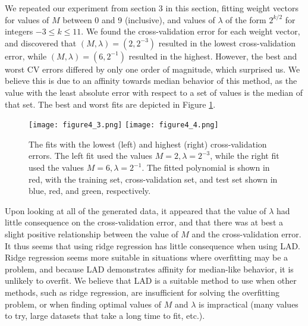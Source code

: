 \documentclass{article}
\begin{document}
We repeated our experiment from section 3 in this section, fitting weight vectors for values of $M$ between 0 and 9 (inclusive), and values of $\lambda$ of the form $2^{k/2}$ for integers $-3 \le k \le 11$. We found the cross-validation error for each weight vector, and discovered that $(M, \lambda) = (2, 2^{-3})$ resulted in the lowest cross-validation error, while $(M, \lambda) = (6, 2^{-1})$ resulted in the highest. However, the best and worst CV errors differed by only one order of magnitude, which surprised us. We believe this is due to an affinity towards median behavior of this method, as the value with the least absolute error with respect to a set of values is the median of that set. The best and worst fits are depicted in Figure \ref{p4figure}.

\begin{figure}
\label{p4figure}
\texttt{[image: figure4\_3.png]}
\texttt{[image: figure4\_4.png]}
\caption{The fits with the lowest (left) and highest (right) cross-validation errors. The left fit used the values $M=2, \lambda = 2^{-3}$, while the right fit used the values $M=6, \lambda = 2^{-1}$. The fitted polynomial is shown in red, with the training set, cross-validation set, and test set shown in blue, red, and green, respectively.}
\end{figure}

Upon looking at all of the generated data, it appeared that the value of $\lambda$ had little consequence on the cross-validation error, and that there was at best a slight positive relationship between the value of $M$ and the cross-validation error. It thus seems that using ridge regression has little consequence when using LAD. Ridge regression seems more suitable in situations where overfitting may be a problem, and because LAD demonstrates affinity for median-like behavior, it is unlikely to overfit. We believe that LAD is a suitable method to use when other methods, such as ridge regression, are insufficient for solving the overfitting problem, or when finding optimal values of $M$ and $\lambda$ is impractical (many values to try, large datasets that take a long time to fit, etc.).
\end{document}
